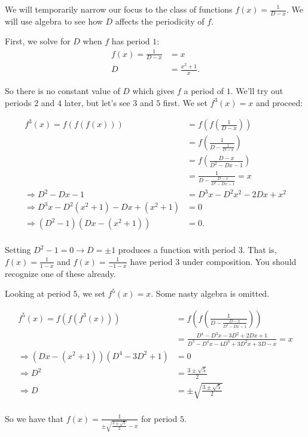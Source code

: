 \documentclass[../gatm.tex]{subfiles}
\begin{document}
\noindent We will temporarily narrow our focus to the class of functions $f(x)=\frac{1}{D-x}$. We will use algebra to see how $D$ affects the periodicity of $f$.

First, we solve for $D$ when $f$ has period $1$:
\begin{align*}
f(x)=\frac{1}{D-x}&=x \\
D&=\frac{x^2+1}{x}.
\end{align*}

\noindent So there is no constant value of $D$ which gives $f$ a period of $1$. We'll try out periods $2$ and $4$ later, but let's see $3$ and $5$ first. We set $f^3(x)=x$ and proceed:

\allowdisplaybreaks
\begin{align*}
f^3(x)=f(f(f(x)))&=f\left(f\left(\frac{1}{D-x}\right)\right) \\
&= f\left(\frac{1}{D-\frac{1}{D-x}}\right) \\
&= f\left(\frac{D-x}{D^2-Dx-1}\right) \\
&= \frac{1}{D-\frac{D-x}{D^2-Dx-1}} = x \\
\Longrightarrow D^2-Dx-1&=D^3x-D^2x^2-2Dx+x^2 \\
\Longrightarrow D^3x-D^2(x^2+1)-Dx+(x^2+1)&=0 \\
\Longrightarrow (D^2-1)(Dx-(x^2+1))&=0. \\
\end{align*}

\noindent Setting $D^2-1=0\rightarrow D=\pm 1$ produces a function with period $3$. That is, $f(x)=\frac{1}{1-x}$ and $f(x)=\frac{1}{-1-x}$ have period $3$ under composition. You should recognize one of these already.

Looking at period $5$, we set $f^5(x)=x$. Some nasty algebra is omitted.

\begin{align*}
f^5(x)=f(f(f^3(x)))&=f\left(f\left(\frac{1}{D-\frac{D-x}{D^2-Dx-1}}\right)\right) \\
&=\frac{D^4-D^3x-3D^2+2Dx+1}{D^5-D^4x-4D^3+3D^2x+3D-x}=x \\
\Longrightarrow (Dx-(x^2+1))(D^4-3D^2+1)&=0 \\
\Longrightarrow D^2&=\frac{3\pm\sqrt{5}}{2} \\
\Longrightarrow D &= \pm{\sqrt{\frac{3\pm\sqrt{5}}{2}}} \\
\end{align*}

\noindent So we have that $f(x)=\frac{1}{\pm\sqrt{\frac{3\pm\sqrt{5}}{2}}-x}$ for period $5$.
\end{document}
